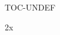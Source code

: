 \documentclass{article}
\begin{document}
\ifdefined\cnltx@tableofcontents \cnltx@tableofcontents\else TOC-UNDEF\fi\par
\begin{multicols}{2}x\end{multicols}
\end{document}

